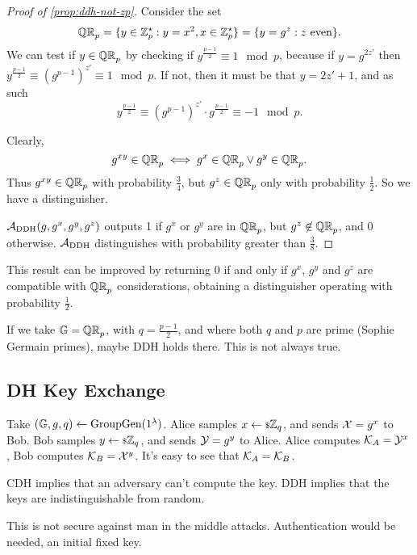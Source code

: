 \begin{proof}[Proof of \cref{prop:ddh-not-zp}]
	Consider the set
	\begin{equation*}
		\mathbb{QR}_{p} = \{ y \in \mathbb{Z}_p^{\star} : y = x^2, x \in \mathbb{Z}_p^{\star} \} = \{ y = g^z : z \text{ even} \}.
	\end{equation*}
	We can test if $y \in \mathbb{QR}_{p}$ by checking if $y^{\frac{p-1}{2}} \equiv 1 \mod p$, because if $y = g^{2z'}$ then $y^{\frac{p-1}{2}} \equiv \left( g^{p-1} \right)^{z'} \equiv 1 \mod p$.
	If not, then it must be that $y = 2 z' + 1$, and as such
	\begin{equation*}
		y^{\frac{p-1}{2}} \equiv \left( g^{p-1} \right)^{z'} \cdot g^{\frac{p-1}{2}} \equiv -1 \mod p.
	\end{equation*}

	Clearly,
	\begin{equation*}
		g^{xy} \in \mathbb{QR}_{p} \iff g^{x} \in \mathbb{QR}_{p} \lor g^y \in \mathbb{QR}_{p}.
	\end{equation*}
	Thus $g^{xy} \in \mathbb{QR}_{p}$ with probability $\frac{3}{4}$, but $g^z \in \mathbb{QR}_{p}$ only with probability $\frac{1}{2}$.
	So we have a distinguisher.

	$\mathcal{A}_{\text{DDH}}(g, g^x, g^y, g^z)$ outputs 1 if $g^x$ or $g^y$ are in $\mathbb{QR}_{p}$, but $g^z \not\in \mathbb{QR}_{p}$, and $0$ otherwise.
	$\mathcal{A}_{\text{DDH}}$ distinguishes with probability greater than $\frac{3}{8}$.
\end{proof}
This result can be improved by returning 0 if and only if $g^x$, $g^y$ and $g^z$ are compatible with $\mathbb{QR}_{p}$ considerations, obtaining a distinguisher operating with probability $\frac{1}{2}$.

If we take $\mathbb{G} = \mathbb{QR}_{p}$, with $q = \frac{p-1}{2}$, and where both $q$ and $p$ are prime (Sophie Germain primes), maybe \ac{DDH} holds there.
This is not always true.

\subsection{\acl{DH} Key Exchange}

Take $(\mathbb{G} , \allowbreak g , \allowbreak q) \leftarrow \mathrm{GroupGen}(1^{\lambda})$.
Alice samples $x \leftarrow {\scriptstyle \$} {\mathbb{Z}_q}$, and sends $\mathcal{X} = g^x$ to Bob.
Bob samples $y \leftarrow {\scriptstyle \$} {\mathbb{Z}_q}$, and sends $\mathcal{Y} = g^y$ to Alice.
Alice computes $\mathcal{K}_A = \mathcal{Y}^x$, Bob computes $\mathcal{K}_B = \mathcal{X}^y$.
It's easy to see that $\mathcal{K}_A = \mathcal{K}_B$.

\ac{CDH} implies that an adversary can't compute the key.
\ac{DDH} implies that the keys are indistinguishable from random.

This is not secure against man in the middle attacks.
Authentication would be needed, an initial fixed key.

